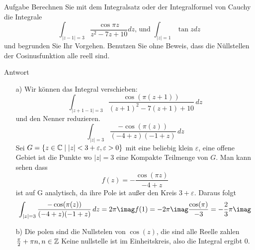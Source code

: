 \documentclass{scrartcl}
\begin{document}
\maketitle
\begin{section}{Aufgabe}%
Berechnen Sie mit dem Integralsatz oder der Integralformel von Cauchy die Integrale
\[\int_{|z-1|=3}\frac{\cos \pi z} {z^2 - 7z + 10}dz\text{, und }\int_{|z|=1}\tan z dz\]
und begrunden Sie Ihr Vorgehen. Benutzen Sie ohne Beweis, dass die Nüllstellen der
Cosinusfunktion alle reell sind.

\begin{subsection}{Antwort}
    \begin{itemize}
        \item[a)]
    Wir können das Integral verschieben:
    \[\int_{|z+1-1|=3} \frac{\cos (\pi  (z+1))}{(z+1)^2-7 (z+1)+10} \, dz\]
    und den Nenner reduzieren.
    \[\int_{|z|=3} \frac{-\cos (\pi  (z))}{(-4+z) (-1+z)} \, dz\]
Sei $G=\qty{z\in\mathbb{C}\mid \qty|z|<3+\varepsilon,\varepsilon>0}$ mit eine beliebig klein $\varepsilon$, eine offene Gebiet ist die Punkte wo $|z|=3$ eine Kompakte Teilmenge von $G$. Man kann sehen dass 
\[f(z)=-\frac{\cos(\pi z)}{-4+z}\] ist auf G analytisch, da ihre Pole ist außer den Kreis $3+\varepsilon$.
Daraus folgt
\[\int_{|z|=3} \frac{-\cos (\pi  (z))}{(-4+z) (-1+z)} \, dz=2\pi \imag f(1)=-2\pi \imag \frac{\cos(\pi)}{-3}=-\frac{2}{3}\pi \imag \]
\item[b)] 
Die polen sind die Nullstelen von $\cos(z)$, die sind alle Reelle zahlen $\frac{\pi}2 +\pi n,n \in \mathbb{Z} $
Keine nullstelle ist im Einheitskreis, also die Integral ergibt 0.
    \end{itemize} 
\end{subsection}
\end{section}
\end{document}

